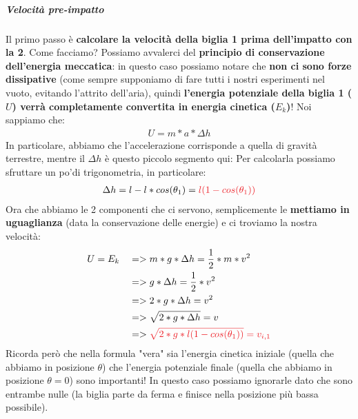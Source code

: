                 \subparagraph{Velocità pre-impatto}
                    Il primo passo è \textbf{calcolare la velocità della biglia 1 prima dell'impatto con la 2}. Come facciamo? Possiamo avvalerci del \textbf{principio di conservazione dell'energia meccatica}: in questo caso possiamo notare che \textbf{non ci sono forze dissipative} (come sempre supponiamo di fare tutti i nostri esperimenti nel vuoto, evitando l'attrito dell'aria), quindi \textbf{l'energia potenziale della biglia 1 ($U$) verrà completamente convertita in energia cinetica ($E_k$)}! Noi sappiamo che:
                    \begin{align*}
                        U = m*a*\Delta h
                    \end{align*}
                    In particolare, abbiamo che l'accelerazione corrisponde a quella di gravità terrestre, mentre il $\Delta h$ è questo piccolo segmento qui:
                    Per calcolarla possiamo sfruttare un po'di trigonometria, in particolare:
                    \begin{align*}
                        \Delta h = l-l*cos(\theta_1)=\textcolor{Red}{l(1-cos(\theta_1))}
                    \end{align*}
                    Ora che abbiamo le 2 componenti che ci servono, semplicemente le \textbf{mettiamo in uguaglianza} (data la conservazione delle energie) e ci troviamo la nostra velocità:
                    \begin{align*}
                        & U = E_k &&=>m*g*\Delta h = \frac{1}{2}*m*v^2\\
                        & && => g*\Delta h = \frac{1}{2}*v^2\\
                        & && => 2*g*\Delta h = v^2\\
                        & && => \sqrt{2*g*\Delta h} = v\\
                        & && => \textcolor{Red}{\sqrt{2*g*l(1-cos(\theta_1))} = v_{i, 1}}
                    \end{align*}
                    Ricorda però che nella formula "vera" sia l'energia cinetica iniziale (quella che abbiamo in posizione $\theta$) che l'energia potenziale finale (quella che abbiamo in posizione $\theta = 0$) sono importanti! In questo caso possiamo ignorarle dato che sono entrambe nulle (la biglia parte da ferma e finisce nella posizione più bassa possibile).

